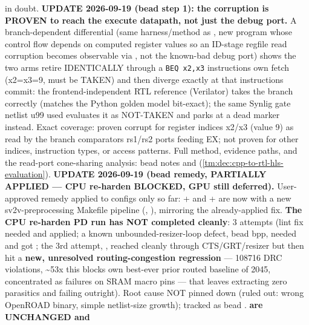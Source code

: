 \begin{record}
in doubt. \bad{} \textbf{UPDATE 2026-09-19 (bead  step 1): the
corruption is PROVEN to reach the execute datapath, not just the debug
port.} A branch-dependent differential (same 
harness/\allowbreak{}method as , new program whose control
flow depends on computed register values so an ID-stage regfile read
corruption becomes observable via , not the known-bad
debug port) shows the two arms retire IDENTICALLY through a
\texttt{BEQ\ x2,\allowbreak{}x3} instruction\textquotesingle s own fetch
(x2=x3=9, must be TAKEN) and then diverge exactly at that
instruction\textquotesingle s commit: the frontend-independent RTL
reference (Verilator) takes the branch correctly (matches the Python
golden model bit-exact); the same Synlig gate netlist u99 used evaluates
it as NOT-TAKEN and parks at a dead marker instead. Exact coverage:
proven corrupt for register indices x2/x3 (value 9) as read by the
branch comparator\textquotesingle s rs1/rs2 ports feeding EX; not proven
for other indices, instruction types, or access patterns. Full method,
evidence paths, and the read-port cone-sharing analysis: bead 
notes and  (\cref{tm:dec:cpp-to-rtl-hls-evaluation}). \bad{} \textbf{UPDATE
2026-09-19 (bead  remedy, PARTIALLY APPLIED --- CPU re-harden
BLOCKED, GPU still deferred).} User-approved remedy applied to configs
only so far:  + 
and  +  are now
 with a new sv2v-preprocessing Makefile pipeline
(, ), mirroring the
already-applied  fix. \textbf{The CPU re-harden PD run
has NOT completed cleanly}: 3 attempts (lint fix needed and applied; a
known unbounded-resizer-loop defect, bead bpp, needed and got
; the 3rd attempt,
, reached 
cleanly through CTS/\allowbreak{}GRT/\allowbreak{}resizer but then hit a
\textbf{new, unresolved routing-congestion regression} --- 108716 DRC
violations, \textasciitilde53x this block\textquotesingle s own
best-ever prior routed baseline of 2045, concentrated as 
failures on SRAM macro pins --- that leaves 
extracting zero parasitics and  failing
outright). Root cause NOT pinned down (ruled out: wrong OpenROAD binary,
simple netlist-size growth); tracked as bead .
\textbf{ are UNCHANGED and
}
\end{record}
